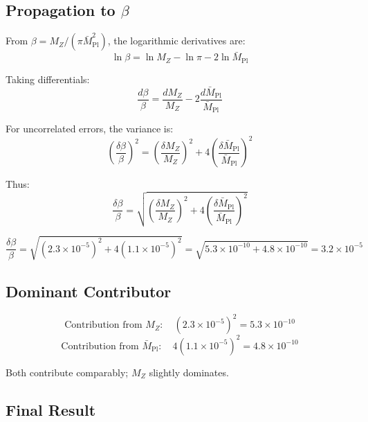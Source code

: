 \documentclass[11pt,a4paper]{article}
\newcommand{\Mpl}{\bar{M}_{\mathrm{Pl}}}
\newcommand{\MZ}{M_Z}
\theoremstyle{definition}
\theoremstyle{plain}
\theoremstyle{remark}
\begin{document}
\subsection{Propagation to $\beta$}

From $\beta = \MZ/(\pi\Mpl^2)$, the logarithmic derivatives are:
\begin{equation}
\ln\beta = \ln\MZ - \ln\pi - 2\ln\Mpl
\label{eq:ln-beta}
\end{equation}

Taking differentials:
\begin{equation}
\frac{d\beta}{\beta} = \frac{d\MZ}{\MZ} - 2\frac{d\Mpl}{\Mpl}
\label{eq:d-beta}
\end{equation}

For uncorrelated errors, the variance is:
\begin{equation}
\left(\frac{\delta\beta}{\beta}\right)^2 = \left(\frac{\delta\MZ}{\MZ}\right)^2 + 4\left(\frac{\delta\Mpl}{\Mpl}\right)^2
\label{eq:beta-var}
\end{equation}

Thus:
\begin{equation}
\frac{\delta\beta}{\beta} = \sqrt{\left(\frac{\delta\MZ}{\MZ}\right)^2 + 4\left(\frac{\delta\Mpl}{\Mpl}\right)^2}
\label{eq:beta-uncertainty}
\end{equation}

\begin{equation}
\frac{\delta\beta}{\beta} = \sqrt{(2.3 \times 10^{-5})^2 + 4(1.1 \times 10^{-5})^2}
= \sqrt{5.3 \times 10^{-10} + 4.8 \times 10^{-10}} = 3.2 \times 10^{-5}
\label{eq:beta-uncertainty-numeric}
\end{equation}

\subsection{Dominant Contributor}

\begin{equation}
\text{Contribution from } \MZ: \quad (2.3 \times 10^{-5})^2 = 5.3 \times 10^{-10}
\end{equation}
\begin{equation}
\text{Contribution from } \Mpl: \quad 4(1.1 \times 10^{-5})^2 = 4.8 \times 10^{-10}
\end{equation}

Both contribute comparably; $\MZ$ slightly dominates.

\subsection{Final Result}
\end{document}
